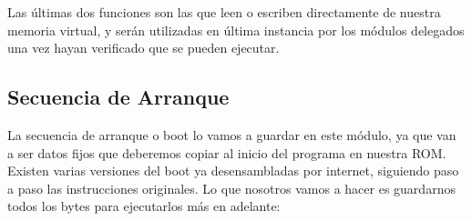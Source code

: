Las últimas dos funciones son las que leen o escriben directamente de nuestra memoria virtual, y serán utilizadas en última instancia por los módulos delegados una vez hayan verificado que se pueden ejecutar.

\subsection{Secuencia de Arranque}

La secuencia de arranque o boot lo vamos a guardar en este módulo, ya que van a ser datos fijos que deberemos copiar al inicio del programa en nuestra ROM. Existen varias versiones del boot ya desensambladas por internet, siguiendo paso a paso las instrucciones originales. Lo que nosotros vamos a hacer es guardarnos todos los bytes para ejecutarlos más en adelante:

